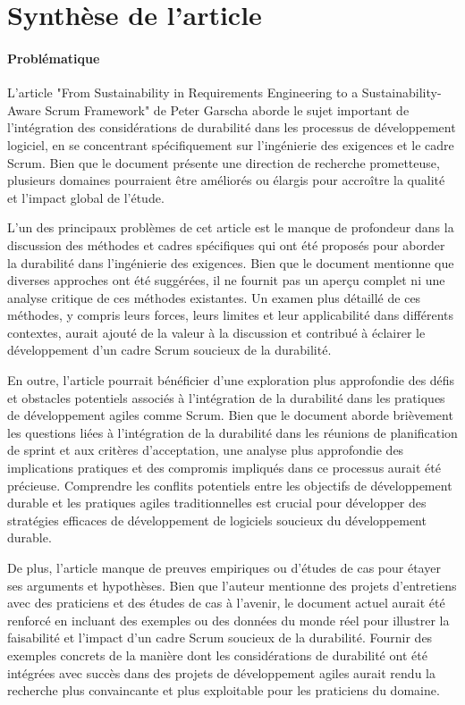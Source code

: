 \section{Synthèse de l'article}

\paragraph{Problématique}
L'article "From Sustainability in Requirements Engineering to a Sustainability-Aware Scrum Framework" de Peter Garscha aborde le sujet important de l'intégration des considérations de durabilité dans les processus de développement logiciel, en se concentrant spécifiquement sur l'ingénierie des exigences et le cadre Scrum. Bien que le document présente une direction de recherche prometteuse, plusieurs domaines pourraient être améliorés ou élargis pour accroître la qualité et l’impact global de l’étude.

L’un des principaux problèmes de cet article est le manque de profondeur dans la discussion des méthodes et cadres spécifiques qui ont été proposés pour aborder la durabilité dans l’ingénierie des exigences. Bien que le document mentionne que diverses approches ont été suggérées, il ne fournit pas un aperçu complet ni une analyse critique de ces méthodes existantes. Un examen plus détaillé de ces méthodes, y compris leurs forces, leurs limites et leur applicabilité dans différents contextes, aurait ajouté de la valeur à la discussion et contribué à éclairer le développement d'un cadre Scrum soucieux de la durabilité.

En outre, l’article pourrait bénéficier d’une exploration plus approfondie des défis et obstacles potentiels associés à l’intégration de la durabilité dans les pratiques de développement agiles comme Scrum. Bien que le document aborde brièvement les questions liées à l'intégration de la durabilité dans les réunions de planification de sprint et aux critères d'acceptation, une analyse plus approfondie des implications pratiques et des compromis impliqués dans ce processus aurait été précieuse. Comprendre les conflits potentiels entre les objectifs de développement durable et les pratiques agiles traditionnelles est crucial pour développer des stratégies efficaces de développement de logiciels soucieux du développement durable.

De plus, l’article manque de preuves empiriques ou d’études de cas pour étayer ses arguments et hypothèses. Bien que l'auteur mentionne des projets d'entretiens avec des praticiens et des études de cas à l'avenir, le document actuel aurait été renforcé en incluant des exemples ou des données du monde réel pour illustrer la faisabilité et l'impact d'un cadre Scrum soucieux de la durabilité. Fournir des exemples concrets de la manière dont les considérations de durabilité ont été intégrées avec succès dans des projets de développement agiles aurait rendu la recherche plus convaincante et plus exploitable pour les praticiens du domaine.

